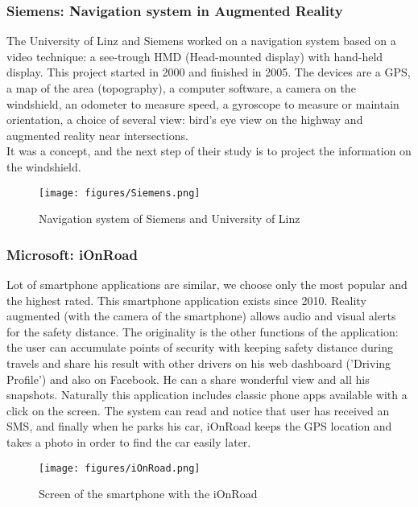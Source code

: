 \documentclass[a4paper]{article}
\begin{document}
\subsubsection{Siemens: Navigation system in Augmented Reality}

The University of Linz and Siemens \cite{Siemens} worked on a navigation system based on a video technique: a see-trough HMD (Head-mounted display) with hand-held display. This project started in 2000 and finished in 2005.
The devices are a GPS, a map of the area (topography), a computer software, a camera on the windshield, an odometer to measure speed, a gyroscope to measure or maintain orientation, a choice of several view: bird's eye view on the highway and augmented reality near intersections.\\
It was a concept, and the next step of their study is to project the information on the windshield.
\begin{figure}[!htb]
\begin{center}
\texttt{[image: figures/Siemens.png]}
\caption{Navigation system of Siemens and University of Linz}
\end{center}
\end{figure}

\subsubsection{Microsoft: iOnRoad}

Lot of smartphone applications are similar, we choose only the most popular and the highest rated. This smartphone application exists since 2010. Reality augmented (with the camera of the smartphone) allows audio and visual alerts for the safety distance. The originality is the other functions of the application: the user can accumulate points of security with keeping safety distance during travels and share his result with other drivers on his web dashboard ('Driving Profile') and also on Facebook. He can a share wonderful view and all his snapshots. Naturally this application includes classic phone apps available with a click on the screen. The system can read and notice that user has received an SMS, and finally when he parks his car, iOnRoad keeps the GPS location and takes a photo in order to find the car easily later.
\begin{figure}[!htb]
\begin{center}
\texttt{[image: figures/iOnRoad.png]}
\caption{Screen of the smartphone with the iOnRoad}
\end{center}
\end{figure}
\end{document}

